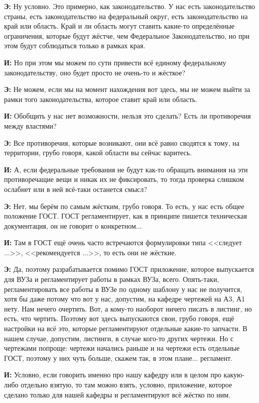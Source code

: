 \textbf{Э: }Ну условно. Это примерно, как законодательство. У нас есть законодательство страны, есть законодательство на федеральный округ, есть законодательство на край или область. Край и ли область могут ставить какие-то определённые ограничения, которые будут жёстче, чем Федеральное Законодательство, но при этом будут соблюдаться только в рамках края.

\textbf{И: }Но при этом мы можем по сути привести всё единому федеральному законодательству, оно будет просто не очень-то и жёсткое?

\textbf{Э: }Не можем, если мы на момент нахождения вот здесь, мы не можем выйти за рамки того законодательства, которое ставит край или область.

\textbf{И: }Обобщить у нас нет возможности, нельзя это сделать? Есть ли противоречия между властями?

\textbf{Э: }Все противоречия, которые возникают, они всё равно сводятся к тому, на территории, грубо говоря, какой области вы сейчас варитесь.

\textbf{И: }А, если федеральные требования не будут как-то обращать внимания на эти противоречащие вещи и никак их не фиксировать, то тогда проверка слишком ослабнет или в ней всё-таки останется смысл?

\textbf{Э: }Нет, мы берём по самым жёстким, грубо говоря. То есть, у нас есть общее положение ГОСТ. ГОСТ регламентирует, как в принципе пишется техническая документация, он не говорит о конкретном...

\textbf{И: }Там в ГОСТ ещё очень часто встречаются формулировки типа <<следует ...>>, <<рекомендуется ...>>, то есть они не жёсткие.

\textbf{Э: }Да, поэтому разрабатывается помимо ГОСТ приложение, которое выпускается для ВУЗа и регламентирует работы в рамках ВУЗа, всего. Опять-таки, регламентировать все работы в ВУЗе по одному шаблону у нас не получится, хотя бы даже потому что вот у нас, допустим, на кафедре чертежей на А3, А1 нету. Нам нечего очертить. Вот, а кому-то наоборот ничего писать в листинг, но есть, что чертить. Поэтому вот здесь выпускаются свои, грубо говоря, ещё настройки на всё это, которые регламентируют отдельные какие-то запчасти. В нашем случае, допустим, листинги, в случае кого-то других чертежи. Но с чертежами попроще: чертежи начались раньше и на чертежи есть отдельные ГОСТ, поэтому у них чуть больше, скажем так, в этом плане... регламент.

\textbf{И: }Условно, если говорить именно про нашу кафедру или в целом про какую-либо отдельно взятую, то там можно взять, условно, приложение, которое сделано только для нашей кафедры и регламентируют всё жёстко по ним.

